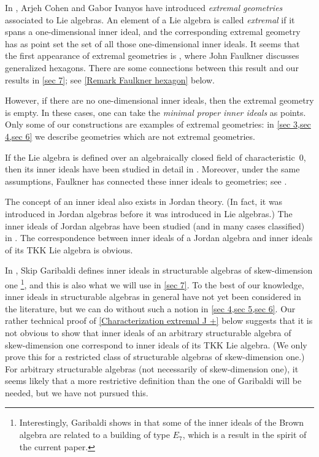 \documentclass[oneside,a4paper]{amsart} %
\theoremstyle{definition}
\numberwithin{equation}{section}
\begin{document}
\medskip

In \cite{Cohen2006}, Arjeh Cohen and Gabor Ivanyos have introduced \emph{extremal geometries} associated to Lie algebras.
An element of a Lie algebra is called \textit{extremal} if it spans a one-dimensional inner ideal,
and the corresponding extremal geometry has as point set the set of all those one-dimensional inner ideals.
It seems that the first appearance of extremal geometries is \cite[Chapter 12]{Faulkner1977}, where John Faulkner discusses generalized hexagons.
There are some connections between this result and our results in \cref{sec 7}; see \cref{Remark Faulkner hexagon} below.

However, if there are no one-dimensional inner ideals, then the extremal geometry is empty.
In these cases, one can take the \textit{minimal proper inner ideals} as points.
Only some of our constructions are examples of extremal geometries:
in \cref{sec 3,sec 4,sec 6} we describe geometries which are not extremal geometries.


If the Lie algebra is defined over an algebraically closed field of characteristic~$0$, then its inner ideals have been studied in detail in \cite{Draper2012}.
Moreover, under the same assumptions, Faulkner has connected these inner ideals to geometries; see \cite{Faulkner1973}.


The concept of an inner ideal also exists in Jordan theory. 
(In fact, it was introduced in Jordan algebras before it was introduced in Lie algebras.)
The inner ideals of Jordan algebras have been studied (and in many cases classified) in \cite{McCrimmon1971b}.
The correspondence between inner ideals of a Jordan algebra and inner ideals of its TKK Lie algebra is obvious.

In \cite{Garibaldi2001}, Skip Garibaldi defines inner ideals in structurable algebras of skew-dimension one%
\footnote{Interestingly, Garibaldi shows in \cite[\S 7]{Garibaldi2001} that some of the inner ideals of the Brown algebra are related to a building of type $E_7$, which is a result in the spirit of the current paper.},
and this is also what we will use in \cref{sec 7}.
To the best of our knowledge, inner ideals in structurable algebras in general have not yet been considered in the literature, but we can do without such a notion in \cref{sec 4,sec 5,sec 6}.
Our rather technical proof of \cref{Characterization extremal J +} below suggests that it is not obvious to show that inner ideals of an arbitrary structurable algebra of skew-dimension one correspond to inner ideals of its TKK Lie algebra. (We only prove this for a restricted class of structurable algebras of skew-dimension one.) %
For arbitrary structurable algebras (not necessarily of skew-dimension one), it seems likely that a more restrictive definition than the one of Garibaldi will be needed, but we have not pursued this.
\end{document}
